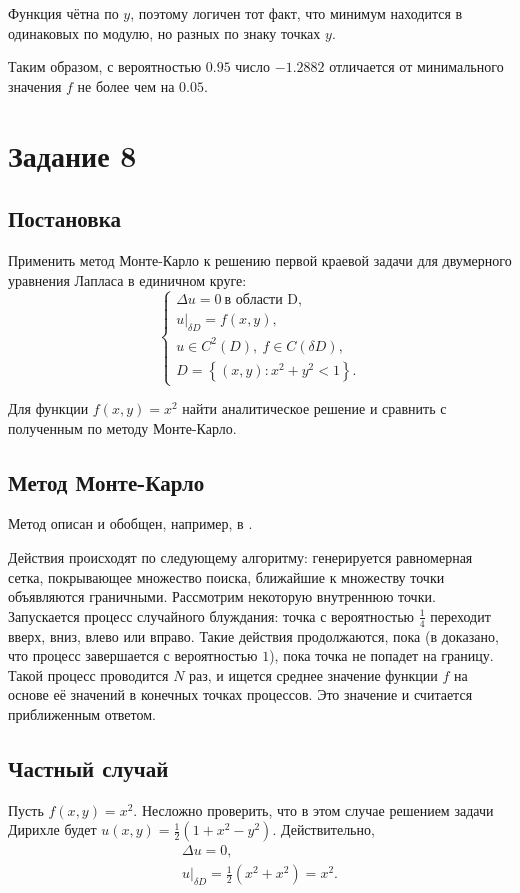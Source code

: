 \documentclass[12pt, a4paper]{article}
\begin{document}
Функция чётна по $y$, поэтому логичен тот факт, что минимум находится в одинаковых по модулю, но разных по знаку точках $y$.

Таким образом, с вероятностью $0.95$ число $-1.2882$ отличается от минимального значения $f$ не более чем на $0.05$.

\newpage

\section{Задание 8}
\subsection{Постановка}
Применить метод Монте-Карло к решению первой краевой задачи для двумерного уравнения Лапласа в единичном круге:
\[\begin{cases}
\Delta u = 0\ \text {в области D}, \\
\left. u \right|_{\delta D} = f(x,y), \\
u\in C^2(D),\ f\in C(\delta D), \\
D = \left\{ \left( x,y \right)\colon x^2+y^2<1 \right\}.
\end{cases}\]

Для функции $f(x,y)=x^2$ найти аналитическое решение и сравнить с полученным по методу Монте-Карло.

\subsection{Метод Монте-Карло}
Метод описан и обобщен, например, в \cite{Buslenko_Shreider}.

Действия происходят по следующему алгоритму: генерируется равномерная сетка, покрывающее множество поиска, ближайшие к множеству точки объявляются граничными. Рассмотрим некоторую внутреннюю точки. Запускается процесс случайного блуждания: точка с вероятностью $\frac{1}{4}$ переходит вверх, вниз, влево или вправо. Такие действия продолжаются, пока (в \cite{shiryaev} доказано, что процесс завершается с вероятностью $1$), пока точка не попадет на границу. Такой процесс проводится $N$ раз, и ищется среднее значение функции $f$ на основе её значений в конечных точках процессов. Это значение и считается приближенным ответом.


\subsection{Частный случай}
Пусть $f(x,y) = x^2$. Несложно проверить, что в этом случае решением задачи Дирихле будет $u(x,y)=\frac{1}{2}\left( 1+x^2-y^2 \right)$. Действительно, 
\begin{gather*}
\Delta u = 0, \\
\left. u\right| _{\delta D} = \frac 12 \left( x^2 + x^2\right) = x^2.
\end{gather*} 

\newpage



\end{document}

